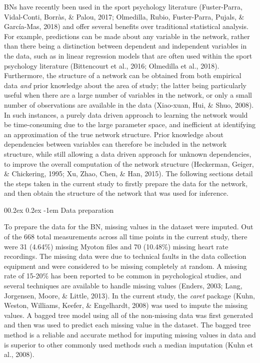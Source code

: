 \documentclass[
  english,
  man,floatsintext]{apa6}
\makeatletter
\renewcommand{\paragraph}{\@startsection{paragraph}{4}{\parindent}%
  {0\baselineskip \@plus 0.2ex \@minus 0.2ex}%
  {-1em}%
  {\normalfont\normalsize\bfseries\itshape\typesectitle}}
\makeatother
\begin{document}
BNs have recently been used in the sport psychology literature (Fuster-Parra, Vidal-Conti, Borràs, \& Palou, 2017; Olmedilla, Rubio, Fuster-Parra, Pujals, \& García-Mas, 2018) and offer several benefits over traditional statistical analysis.
For example, predictions can be made about any variable in the network, rather than there being a distinction between dependent and independent variables in the data, such as in linear regression models that are often used within the sport psychology literature (Bittencourt et al., 2016; Olmedilla et al., 2018).
Furthermore, the structure of a network can be obtained from both empirical data \emph{and} prior knowledge about the area of study; the latter being particularly useful when there are a large number of variables in the network, or only a small number of observations are available in the data (Xiao-xuan, Hui, \& Shuo, 2008).
In such instances, a purely data driven approach to learning the network would be time-consuming due to the large parameter space, and inefficient at identifying an approximation of the true network structure.
Prior knowledge about dependencies between variables can therefore be included in the network structure, while still allowing a data driven approach for unknown dependencies, to improve the overall computation of the network structure (Heckerman, Geiger, \& Chickering, 1995; Xu, Zhao, Chen, \& Han, 2015).
The following sections detail the steps taken in the current study to firstly prepare the data for the network, and then obtain the structure of the network that was used for inference.

\hypertarget{data-preparation}{%
\paragraph{Data preparation}\label{data-preparation}}

To prepare the data for the BN, missing values in the dataset were imputed.
Out of the 668 total measurements across all time points in the current study, there were 31 (4.64\%) missing Myoton files and 70 (10.48\%) missing heart rate recordings. The missing data were due to technical faults in the data collection equipment and were considered to be missing completely at random.
A missing rate of 15-20\% has been reported to be common in psychological studies, and several techniques are available to handle missing values (Enders, 2003; Lang, Jorgensen, Moore, \& Little, 2013).
In the current study, the \emph{caret} package (Kuhn, Weston, Williams, Keefer, \& Engelhardt, 2008) was used to impute the missing values.
A bagged tree model using all of the non-missing data was first generated and then was used to predict each missing value in the dataset.
The bagged tree method is a reliable and accurate method for imputing missing values in data and is superior to other commonly used methods such a median imputation (Kuhn et al., 2008).
\end{document}
